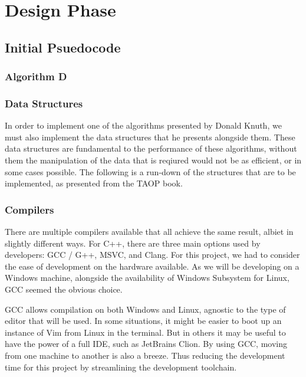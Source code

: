 \documentclass{article}
\begin{document}
\newpage
\section{Design Phase}
\subsection{Initial Psuedocode}
\subsubsection{Algorithm D}

\subsubsection{Data Structures}
In order to implement one of the algorithms presented by Donald Knuth, we must also implement the data structures that he presents alongside
them. These data structures are fundamental to the performance of these algorithms, without them the manipulation of the data that is
reqiured would not be as efficient, or in some cases possible. The following is a run-down of the structures that are to be implemented, as
presented from the TAOP book.


\subsubsection{Compilers}
There are multiple compilers available that all achieve the same result, albiet in slightly different ways. For C++, there are three main
options used by developers: GCC / G++, MSVC, and Clang. For this project, we had to consider the ease of development on the hardware
available. As we will be developing on a Windows machine, alongside the availability of Windows Subsystem for Linux, GCC seemed the obvious
choice.

GCC allows compilation on both Windows and Linux, agnostic to the type of editor that will be used. In some situations, it might be easier to
boot up an instance of Vim from Linux in the terminal. But in others it may be useful to have the power of a full IDE, such as JetBrains
Clion. By using GCC, moving from one machine to another is also a breeze. Thus reducing the development time for this project by
streamlining the development toolchain.
\end{document}
